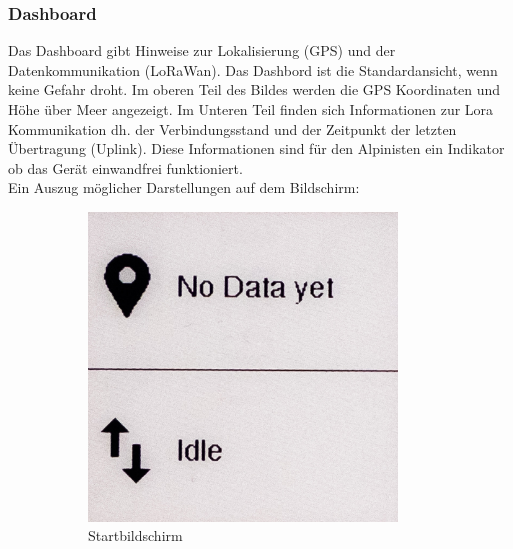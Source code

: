 \documentclass[11pt,english,german]{report}
\theoremstyle{definition}
\begin{document}
\subsubsection{Dashboard}
Das Dashboard gibt Hinweise zur Lokalisierung (GPS) und der Datenkommunikation (LoRaWan). Das Dashbord ist die Standardansicht, wenn keine Gefahr droht. Im oberen Teil des Bildes werden die GPS Koordinaten und Höhe über Meer angezeigt. Im Unteren Teil finden sich Informationen zur Lora Kommunikation dh. der Verbindungsstand und der Zeitpunkt der letzten Übertragung (Uplink). Diese Informationen sind für den Alpinisten ein Indikator ob das Gerät einwandfrei funktioniert.\\[0.3cm]
Ein Auszug möglicher Darstellungen auf dem Bildschirm:
\begin{figure}[H]
	\centering
	\begin{subfigure}{.33\textwidth}
		\centering
		\includegraphics[width=0.9\textwidth]{img/prototype/dashboard_idle.jpg}
		\caption[Bildschrim - Start]
		{Startbildschirm}
	\end{subfigure}%
	\begin{subfigure}{.33\textwidth}
		\centering

\end{subfigure}
\end{figure}
\end{document}
